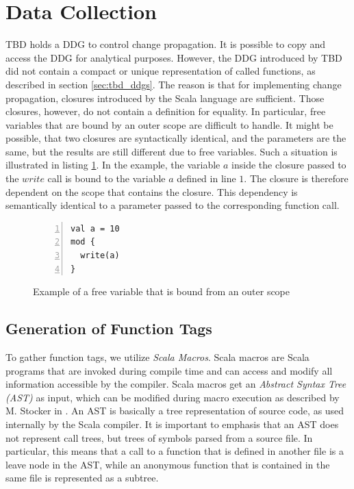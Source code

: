 \section{Data Collection}

TBD holds a DDG to control change propagation. It is possible to copy and access the DDG for analytical purposes. However, the DDG introduced by TBD did not contain a compact or unique representation of called functions, as described in section \ref{sec:tbd_ddgs}. The reason is that for implementing change propagation, closures introduced by the Scala language are sufficient. Those closures, however, do not contain a definition for equality. In particular, free variables that are bound by an outer scope are difficult to handle. It might be possible, that two closures are syntactically identical, and the parameters are the same, but the results are still different due to free variables. Such a situation is illustrated in listing \ref{code:bound_free_var}. In the example, the variable $a$ inside the closure passed to the $write$ call is bound to the variable $a$ defined in line $1$. The closure is therefore dependent on the scope that contains the closure. This dependency is semantically identical to a parameter passed to the corresponding function call. 

\begin{figure}
\begin{lstlisting}[frame=single,basicstyle=\ttfamily,numbers=left,mathescape=true]
val a = 10
mod {
  write(a)
}
\end{lstlisting}
\caption{Example of a free variable that is bound from an outer scope} 
\label{code:bound_free_var}
\end{figure}

\subsection{Generation of Function Tags}

To gather function tags, we utilize \textit{Scala Macros}. Scala macros are Scala programs that are invoked during compile time and can access and modify all information accessible by the compiler. Scala macros get an \textit{Abstract Syntax Tree (AST)} as input, which can be modified during macro execution as described by M. Stocker in \cite{stocker2010scala}. An AST is basically a tree representation of source code, as used internally by the Scala compiler. It is important to emphasis that an AST does not represent call trees, but trees of symbols parsed from a source file. In particular, this means that a call to a function that is defined in another file is a leave node in the AST, while an anonymous function that is contained in the same file is represented as a subtree. 

